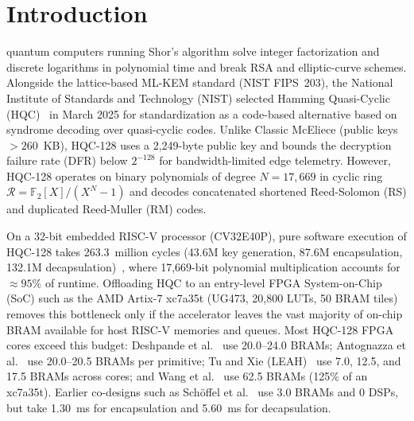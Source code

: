 \documentclass[journal]{IEEEtran}
\begin{document}
\section{Introduction}
 quantum computers running Shor's algorithm solve integer factorization and discrete logarithms in polynomial time and break RSA and elliptic-curve schemes. Alongside the lattice-based ML-KEM standard (NIST FIPS~203), the National Institute of Standards and Technology (NIST) selected Hamming Quasi-Cyclic (HQC)~\cite{melchor2023hqc, nist2025ir8545} in March 2025 for standardization as a code-based alternative based on syndrome decoding over quasi-cyclic codes. Unlike Classic McEliece (public keys $>260$~KB), HQC-128 uses a 2,249-byte public key and bounds the decryption failure rate (DFR) below $2^{-128}$ for bandwidth-limited edge telemetry. However, HQC-128 operates on binary polynomials of degree $N = 17,669$ in cyclic ring $\mathcal{R} = \mathbb{F}_2[X]/(X^N - 1)$ and decodes concatenated shortened Reed-Solomon (RS) and duplicated Reed-Muller (RM) codes.

On a 32-bit embedded RISC-V processor (CV32E40P), pure software execution of HQC-128 takes 263.3~million cycles (43.6M key generation, 87.6M encapsulation, 132.1M decapsulation)~\cite{ras2025optimizing}, where 17,669-bit polynomial multiplication accounts for ${\approx}95\%$ of runtime. Offloading HQC to an entry-level FPGA System-on-Chip (SoC) such as the AMD Artix-7 xc7a35t (UG473, 20,800 LUTs, 50 BRAM tiles) removes this bottleneck only if the accelerator leaves the vast majority of on-chip BRAM available for host RISC-V memories and queues. Most HQC-128 FPGA cores exceed this budget: Deshpande et al.~\cite{deshpande2023fast} use 20.0--24.0 BRAMs; Antognazza et al.~\cite{antognazza2024high} use 20.0--20.5 BRAMs per primitive; Tu and Xie (LEAH)~\cite{tu2024leah} use 7.0, 12.5, and 17.5 BRAMs across cores; and Wang et al.~\cite{wang2024high} use 62.5 BRAMs (125\% of an xc7a35t). Earlier co-designs such as Sch{\"o}ffel et al.~\cite{schoeffel2022code} use 3.0 BRAMs and 0 DSPs, but take 1.30~ms for encapsulation and 5.60~ms for decapsulation.
\end{document}
